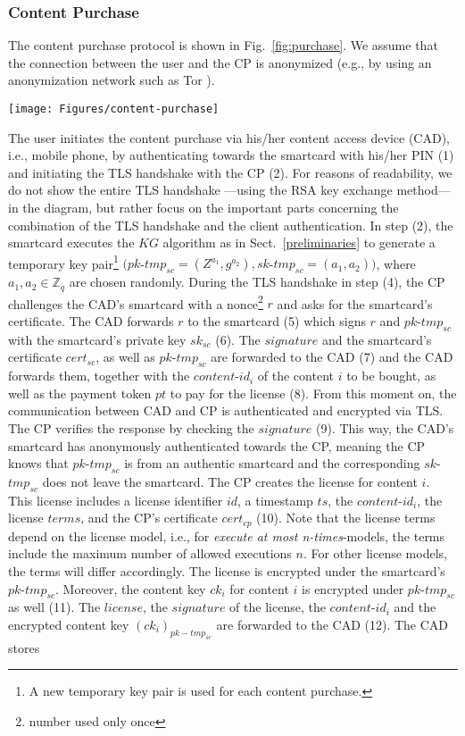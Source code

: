 \documentclass{llncs}
\newcommand{\refSec}[1]{Sect.~\ref{#1}}
\newcommand{\refFig}[1]{Fig.~\ref{#1}}
\begin{document}
\subsubsection{Content Purchase} \label{content_purchase}

The content purchase protocol is shown in \refFig{fig:purchase}. We assume that the connection between the user and the CP is anonymized (e.g., by using an anonymization network such as Tor \cite{tor}).

\begin{figure*}[ht]
	\centering
	\texttt{[image: Figures/content-purchase]}
	\caption{Content purchase protocol.}
	\label{fig:purchase}
\end{figure*} 

The user initiates the content purchase via his/her content access device (CAD), i.e., mobile phone, by authenticating towards the smartcard with his/her PIN (1) and initiating the TLS handshake with the CP (2). For reasons of readability, we do not show the entire TLS handshake \cite{tls_rfc}---using the RSA key exchange method---in the diagram, but rather focus on the important parts concerning the combination of the TLS handshake and the client authentication. In step (2), the smartcard executes the $KG$ algorithm as in \refSec{preliminaries} to generate a temporary key pair\footnote{A new temporary key pair is used for each content purchase.} $(pk$-$tmp_{sc} = (Z^{a_{1}}, g^{a_{2}}), sk$-$tmp_{sc} = (a_{1}, a_{2}))$, where $a_{1}, a_{2} \in \mathbb Z_{q}$ are chosen randomly. During the TLS handshake in step (4), the CP challenges the CAD's smartcard with a nonce\footnote{number used only once} $r$ and asks for the smartcard's certificate. The CAD forwards $r$ to the smartcard (5) which signs $r$ and $pk$-$tmp_{sc}$ with the smartcard's private key $sk_{sc}$ (6). The $signature$ and the smartcard's certificate $cert_{sc}$, as well as $pk$-$tmp_{sc}$ are forwarded to the CAD (7) and the CAD forwards them, together with the $content$-$id_{i}$ of the content $i$ to be bought, as well as the payment token $pt$ to pay for the license (8). From this moment on, the communication between CAD and CP is authenticated and encrypted via TLS. The CP verifies the response by checking the $signature$ (9). This way, the CAD's smartcard has anonymously authenticated towards the CP, meaning the CP knows that $pk$-$tmp_{sc}$ is from an authentic smartcard and the corresponding $sk$-$tmp_{sc}$ does not leave the smartcard. The CP creates the license for content $i$. This license includes a license identifier $id$, a timestamp $ts$, the $content$-$id_{i}$, the license $terms$, and the CP's certificate $cert_{cp}$ (10). Note that the license terms depend on the license model, i.e., for \emph{execute at most n-times}-models, the terms include the maximum number of allowed executions $n$. For other license models, the terms will differ accordingly. The license is encrypted under the smartcard's $pk$-$tmp_{sc}$. Moreover, the content key $ck_{i}$ for content $i$ is encrypted under $pk$-$tmp_{sc}$ as well (11). The $license$, the $signature$ of the license, the $content$-$id_{i}$ and the encrypted content key $(ck_i)_{pk-tmp_{sc}}$ are forwarded to the CAD (12). The CAD stores 
\end{document}
